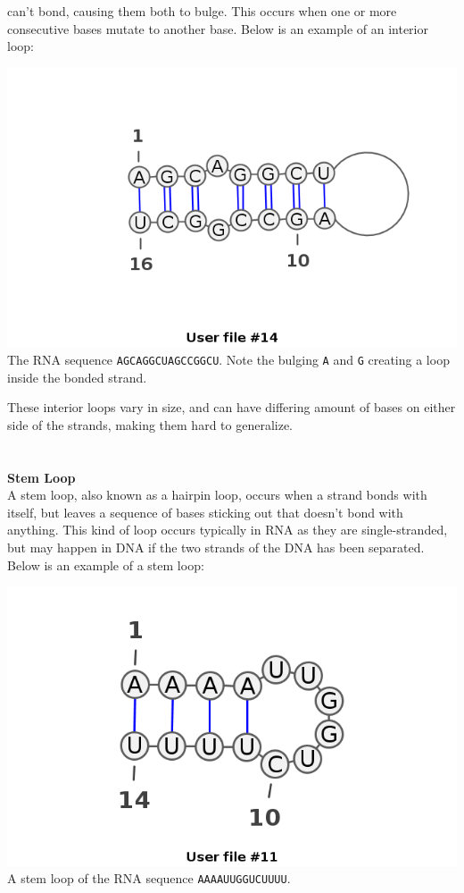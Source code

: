 can't bond, causing them both to bulge. This occurs when one or more 
consecutive bases mutate to another base. Below is an example of an interior 
loop:
\begin{myex}\centering
\centering
\includegraphics[scale=0.5]{./lib/interior-loop.png}\\
The RNA sequence {\tt AGCAGGCUAGCCGGCU}. Note the bulging {\tt A} and {\tt G} 
creating a loop inside the bonded strand.
\end{myex}
These interior loops vary in size, and can have differing amount of bases on 
either side of the strands, making them hard to generalize.\\
\\\\
\textbf{Stem Loop}\\
A stem loop, also known as a hairpin loop, occurs when a strand bonds with 
itself, but leaves a sequence of bases sticking out that doesn't bond with anything. 
This kind of loop occurs typically in RNA as they are single-stranded, but may 
happen in DNA if the two strands of the DNA has been separated. Below is an 
example of a stem loop:
\begin{myex}\centering
\centering
\includegraphics[scale=0.5]{./lib/stem-loop.png}\\
A stem loop of the RNA sequence {\tt AAAAUUGGUCUUUU}.
\end{myex}
